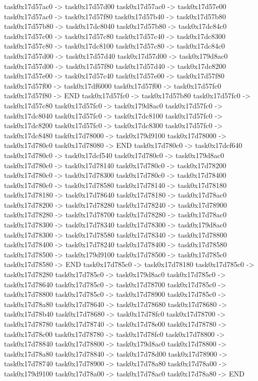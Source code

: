 {	task0x17d57ac0 -> task0x17d57d00
	task0x17d57ac0 -> task0x17d57e00
	task0x17d57ac0 -> task0x17d57f80
	task0x17d57b40 -> task0x17d57b80
	task0x17d57b80 -> task0x17dc8040
	task0x17d57b80 -> task0x17dc84c0
	task0x17d57c00 -> task0x17d57c80
	task0x17d57c40 -> task0x17dc8300
	task0x17d57c80 -> task0x17dc8100
	task0x17d57c80 -> task0x17dc84c0
	task0x17d57d00 -> task0x17d57d40
	task0x17d57d00 -> task0x179d8ac0
	task0x17d57d00 -> task0x17d57f80
	task0x17d57d40 -> task0x17dc8200
	task0x17d57e00 -> task0x17d57c40
	task0x17d57e00 -> task0x17d57f80
	task0x17d57f00 -> task0x17df6000
	task0x17d57f00 -> task0x17d57fc0
	task0x17d57f80 -> END
	task0x17d57fc0 -> task0x17d57b80
	task0x17d57fc0 -> task0x17d57c80
	task0x17d57fc0 -> task0x179d8ac0
	task0x17d57fc0 -> task0x17dc8040
	task0x17d57fc0 -> task0x17dc8100
	task0x17d57fc0 -> task0x17dc8200
	task0x17d57fc0 -> task0x17dc8300
	task0x17d57fc0 -> task0x17dc8480
	task0x17d78000 -> task0x179d9100
	task0x17d78000 -> task0x17d780c0
	task0x17d78080 -> END
	task0x17d780c0 -> task0x17dcf640
	task0x17d780c0 -> task0x17dcf540
	task0x17d780c0 -> task0x179d8ac0
	task0x17d780c0 -> task0x17d78140
	task0x17d780c0 -> task0x17d78200
	task0x17d780c0 -> task0x17d78300
	task0x17d780c0 -> task0x17d78400
	task0x17d780c0 -> task0x17d78580
	task0x17d78140 -> task0x17d78180
	task0x17d78180 -> task0x17d78640
	task0x17d78180 -> task0x17d78ac0
	task0x17d78200 -> task0x17d78280
	task0x17d78240 -> task0x17d78900
	task0x17d78280 -> task0x17d78700
	task0x17d78280 -> task0x17d78ac0
	task0x17d78300 -> task0x17d78340
	task0x17d78300 -> task0x179d8ac0
	task0x17d78300 -> task0x17d78580
	task0x17d78340 -> task0x17d78800
	task0x17d78400 -> task0x17d78240
	task0x17d78400 -> task0x17d78580
	task0x17d78500 -> task0x179d9100
	task0x17d78500 -> task0x17d785c0
	task0x17d78580 -> END
	task0x17d785c0 -> task0x17d78180
	task0x17d785c0 -> task0x17d78280
	task0x17d785c0 -> task0x179d8ac0
	task0x17d785c0 -> task0x17d78640
	task0x17d785c0 -> task0x17d78700
	task0x17d785c0 -> task0x17d78800
	task0x17d785c0 -> task0x17d78900
	task0x17d785c0 -> task0x17d78a80
	task0x17d78640 -> task0x17d78680
	task0x17d78680 -> task0x17d78b40
	task0x17d78680 -> task0x17d78fc0
	task0x17d78700 -> task0x17d78780
	task0x17d78740 -> task0x17d78e00
	task0x17d78780 -> task0x17d78c00
	task0x17d78780 -> task0x17d78fc0
	task0x17d78800 -> task0x17d78840
	task0x17d78800 -> task0x179d8ac0
	task0x17d78800 -> task0x17d78a80
	task0x17d78840 -> task0x17d78d00
	task0x17d78900 -> task0x17d78740
	task0x17d78900 -> task0x17d78a80
	task0x17d78a00 -> task0x179d9100
	task0x17d78a00 -> task0x17d78ac0
	task0x17d78a80 -> END
}
